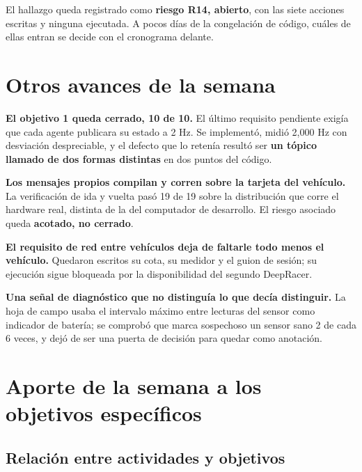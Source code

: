 \documentclass[12pt,letterpaper]{article}
\begin{document}
El hallazgo queda registrado como \textbf{riesgo R14, abierto}, con las siete acciones escritas y ninguna ejecutada. A pocos días de la congelación de código, cuáles de ellas entran se decide con el cronograma delante.

\section{Otros avances de la semana}

\textbf{El objetivo 1 queda cerrado, 10 de 10.} El último requisito pendiente exigía que cada agente publicara su estado a 2 Hz. Se implementó, midió 2,000 Hz con desviación despreciable, y el defecto que lo retenía resultó ser \textbf{un tópico llamado de dos formas distintas} en dos puntos del código.

\textbf{Los mensajes propios compilan y corren sobre la tarjeta del vehículo.} La verificación de ida y vuelta pasó 19 de 19 sobre la distribución que corre el hardware real, distinta de la del computador de desarrollo. El riesgo asociado queda \textbf{acotado, no cerrado}.

\textbf{El requisito de red entre vehículos deja de faltarle todo menos el vehículo.} Quedaron escritos su cota, su medidor y el guion de sesión; su ejecución sigue bloqueada por la disponibilidad del segundo DeepRacer.

\textbf{Una señal de diagnóstico que no distinguía lo que decía distinguir.} La hoja de campo usaba el intervalo máximo entre lecturas del sensor como indicador de batería; se comprobó que marca sospechoso un sensor sano 2 de cada 6 veces, y dejó de ser una puerta de decisión para quedar como anotación.

\section{Aporte de la semana a los objetivos específicos}
\label{sec:aporte}

\subsection{Relación entre actividades y objetivos}
\end{document}
